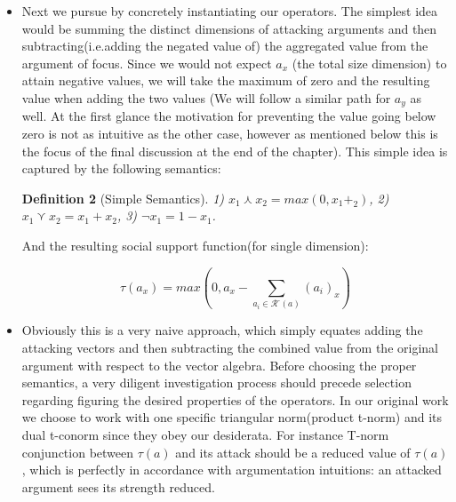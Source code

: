 \documentclass{article}
\newtheorem{definition}{Definition}
\newcommand{\args}{\mathcal{A}} %
\newcommand{\att}{\mathcal{R}}  %
\newcommand{\attackers}[1]{\att^\text{-}\left(#1\right)}
\newcommand{\SAFand}{\curlywedge}     %
\DeclareMathOperator*{\SAFOr}{\bigcurlyvee} %
\begin{document}
{\begin{itemize}
\begin{definition}[Social support]
\label{def:ss}
  Social support of an argument  $a \in \args$ is loosely $\tau(a) \triangleq \tau([a_{x}, a_{y}]) \triangleq [(\tau(a_{x})), (\tau(a_{y}))]$ where $\tau(a_{x})$ (respectively $\tau(a_{y})$):
  $$\displaystyle \tau(a_x) = a_{x} \SAFand \lnot \SAFOr_{a_i \in \attackers{a}} (a_{i})_{x}$$
\end{definition}

Please note that unlike the model function of the original work, the above function is NOT a recursive one. Thus it's neither a fixed-point calculation, nor the computation has to follow a specific order with respect to the arguments.  

\item Next we pursue by concretely instantiating our operators. The simplest idea would be summing the distinct dimensions of attacking arguments and then subtracting(i.e.adding the negated value of) the aggregated value from the argument of focus.  Since we would not expect $a_{x}$ (the total size dimension) to attain negative values, we will take the maximum of zero and the resulting value when adding the two values (We will follow a similar path for $a_{y}$ as well. At the first glance the motivation for preventing the value going below zero is not as intuitive as the other case, however as mentioned below this is the focus of the final discussion at the end of the chapter). This simple idea is captured by the following semantics:

\begin{definition} [Simple Semantics]
 1) $x_{1}\curlywedge
x_{2}=max(0, x_{1} +_{2})$, 2) $x_{1}\curlyvee x_{2}=x_{1}+x_{2}$, 3) $\lnot x_{1}=1-x_{1}$.
\end{definition}

And the resulting social support function(for single dimension):

$$\displaystyle \tau(a_x) =   max (0, a_{x} - \sum_{a_i \in \attackers{a}}^{} (a_{i})_{x}   ) $$%


\item Obviously this is a very naive approach, which simply equates adding the attacking vectors and then subtracting the combined value from the original argument with respect to the vector algebra. Before choosing the proper semantics, a very diligent investigation process should precede selection regarding figuring the desired properties of the operators. In our original work we choose to work with one specific triangular norm(product t-norm) and its dual t-conorm since they obey our desiderata. For instance T-norm conjunction between $\tau(a)$ and its attack should be a reduced value of $\tau(a)$, which is perfectly in accordance with argumentation intuitions: an attacked argument sees its strength reduced. 


\end{itemize}}
\end{document}
